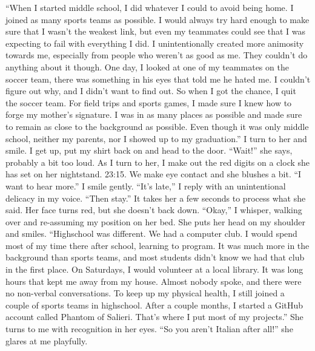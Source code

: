 \documentclass[a4paper, 12pt]{book}
\newcommand\tab[1][1cm]{\hspace*{#1}}
\begin{document}
\tab
“When I started middle school, I did whatever I could to avoid being home.  I joined as many sports teams as possible. I would always try hard enough to make sure that I wasn’t the weakest link, but even my teammates could see that I was expecting to fail with everything I did. I unintentionally created more animosity towards me, especially from people who weren’t as good as me. They couldn’t do anything about it though. One day, I looked at one of my teammates on the soccer team, there was something in his eyes that told me he hated me. I couldn’t figure out why, and I didn’t want to find out. So when I got the chance, I quit the soccer team. For field trips and sports games, I made sure I knew how to forge my mother’s signature. I was in as many places as possible and made sure to remain as close to the background as possible. Even though it was only middle school, neither my parents, nor I showed up to my graduation.” I turn to her and smile. I get up, put my shirt back on and head to the door.
\newline
\tab
“Wait!” she says, probably a bit too loud. As I turn to her, I make out the red digits on a clock she has set on her nightstand. 23:15. We make eye contact and she blushes a bit. “I want to hear more.”
\newline
\tab
I smile gently. “It’s late,” I reply with an unintentional delicacy in my voice.
\newline
\tab
“Then stay.” It takes her a few seconds to process what she said. Her face turns red, but she doesn’t back down.
\newline
\tab
“Okay,” I whisper, walking over and re-assuming my position on her bed. She puts her head on my shoulder and smiles. “Highschool was different. We had a computer club. I would spend most of my time there after school, learning to program. It was much more in the background than sports teams, and most students didn’t know we had that club in the first place. On Saturdays, I would volunteer at a local library. It was long hours that kept me away from my house. Almost nobody spoke, and there were no non-verbal conversations. To keep up my physical health, I still joined a couple of sports teams in highschool. After a couple months, I started a GitHub account called Phantom of Salieri. That’s where I put most of my projects.” 
\newline
\tab
She turns to me with recognition in her eyes. “So you aren’t Italian after all!” she glares at me playfully.
\newline
\tab
\end{document}
